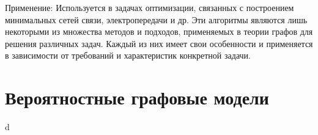 Применение: Используется в задачах оптимизации, связанных с построением минимальных сетей связи, электропередачи и др.
Эти алгоритмы являются лишь некоторыми из множества методов и подходов, применяемых в теории графов для решения различных задач. Каждый из них имеет свои особенности и применяется в зависимости от требований и характеристик конкретной задачи.


\section{Вероятностные графовые модели}

d





